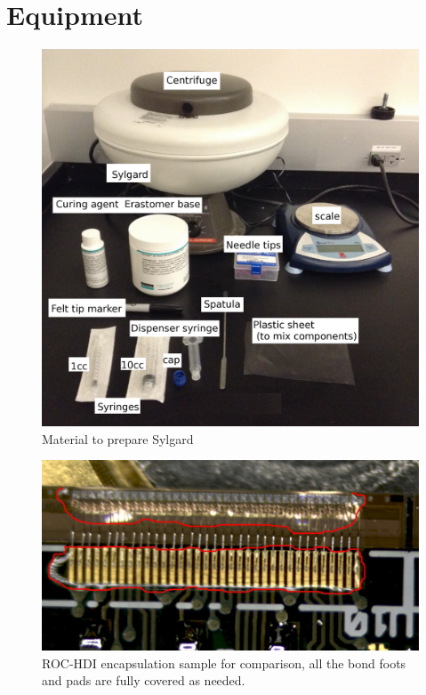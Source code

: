 \documentclass[12pt]{unlsilabsop}
\begin{document}
\section{Equipment}
\begin{figure}[h]
    \begin{center}
        \includegraphics[scale= 0.3]{img/potting_materials.jpg}
        \caption{Material to prepare Sylgard}
        \label{fig:pottingmaterial}
    \end{center}
\end{figure}

\begin{figure}[h]
  \begin{center}
    \includegraphics[width=\textwidth]{img/potting_reference.jpg}
    \caption{ROC-HDI encapsulation sample for comparison, all the bond foots and pads are fully covered as needed.}
    \label{fig:potting_reference}
  \end{center}
\end{figure}
\end{document}

